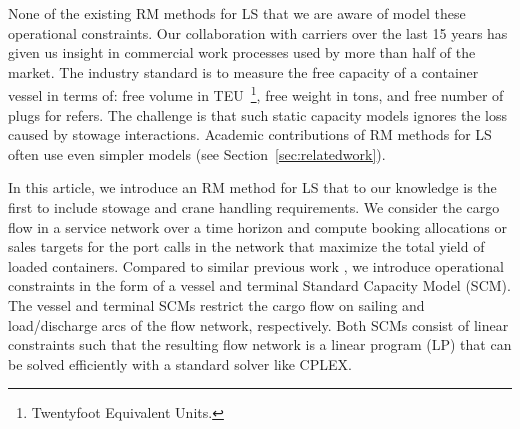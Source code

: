 None of the existing RM methods for LS that we are aware of model these operational constraints. Our collaboration with carriers over the last 15 years has given us insight in commercial work processes used by more than half of the market. The industry standard is to measure the free capacity of a container vessel in terms of: free volume in TEU~\footnote{Twentyfoot Equivalent Units.}, free weight in tons, and free number of plugs for refers. The challenge is that such static capacity models ignores the loss caused by stowage interactions. Academic contributions of RM methods for LS often use even simpler models (see Section~\ref{sec:relatedwork}).


	In this article, we introduce an RM method for LS that to our knowledge is the first to include stowage and crane handling requirements. We consider the cargo flow in a service network over a time horizon and compute booking allocations or sales targets for the port calls in the network that maximize the total yield of loaded containers. Compared to similar previous work \citep[e.g.,][]{Zurheide15}, we introduce operational constraints in the form of a vessel and terminal Standard Capacity Model (SCM). The vessel and terminal SCMs restrict the cargo flow on sailing and load/discharge arcs of the flow network, respectively. Both SCMs consist of linear constraints such that the resulting flow network is a linear program (LP) that can be solved efficiently with a standard solver like CPLEX.
	
	

